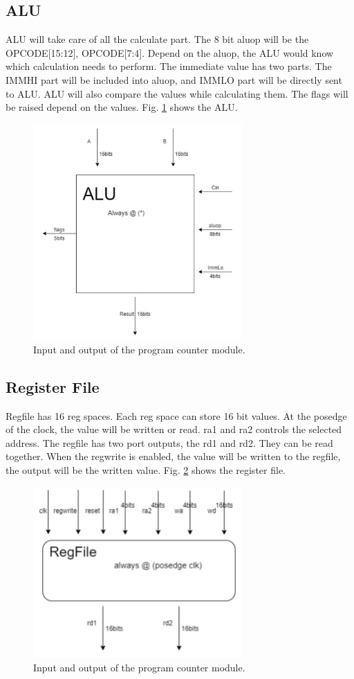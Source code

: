 \documentclass[../ProjectDocumentation.tex]{subfiles}
\begin{document}
\subsection{ALU}
ALU will take care of all the calculate part. The 8 bit aluop will be the {OPCODE[15:12],
OPCODE[7:4]}. Depend on the aluop, the ALU would know which calculation needs to perform.
The immediate value has two parts. The IMMHI part will be included into aluop, and IMMLO
part will be directly sent to ALU. ALU will also compare the values while calculating them. The
flags will be raised depend on the values. Fig. \ref{fig:alu} shows the ALU.
\begin{figure}
\centering
\includegraphics[width=8cm]{alu}
\caption{Input and output of the program counter module.}
\label{fig:alu}
\end{figure}
\subsection{Register File}
Regfile has 16 reg spaces. Each reg space can store 16 bit values. At the posedge of the clock,
the value will be written or read. ra1 and ra2 controls the selected address. The regfile has two
port outputs, the rd1 and rd2. They can be read together. When the regwrite is enabled, the value
will be written to the regfile, the output will be the written value. Fig. \ref{fig:regfile} shows the register file.
\begin{figure}
\centering
\includegraphics[width=8cm]{regfile}
\caption{Input and output of the program counter module.}
\label{fig:regfile}
\end{figure}
\end{document}
